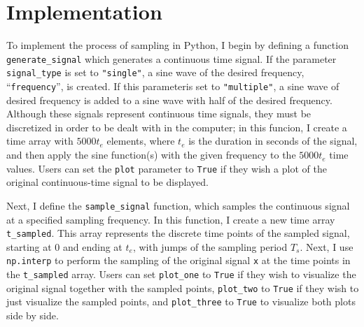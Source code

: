 \documentclass{article}
\begin{document}
\section{Implementation}


To implement the process of sampling in Python, I begin by defining a function \verb|generate_signal| which generates a continuous time signal.
If the parameter \verb|signal_type| is set to \verb|"single"|, a sine wave of the desired frequency, ``\verb|frequency|'', is created.
If this parameteris set to \verb|"multiple"|, a sine wave of desired frequency is added to a sine wave with half of the desired frequency. 
Although these signals represent continuous time signals, they must be discretized in order to be dealt with in the computer;
in this funcion, I create a time array with $5000t_e$ elements, where $t_e$ is the duration in seconds of the signal, 
and then apply the sine function(s) with the given frequency to the $5000 t_e$ time values. 
Users can set the \verb|plot| parameter to \verb|True| if they wish a plot of the original continuous-time signal to be displayed.

Next, I define the \verb|sample_signal| function, which samples the continuous signal at a specified sampling frequency.
In this function, I create a new time array \verb|t_sampled|. 
This array represents the discrete time points of the sampled signal, starting at 0 and ending at $t_e$, with jumps of the sampling period $T_s$.
Next, I use \verb|np.interp| to perform the sampling of the original signal \verb|x| at the time points in the \verb|t_sampled| array.
Users can set \verb|plot_one| to \verb|True| if they wish to visualize the original signal together with the sampled points, \verb|plot_two| to \verb|True| if they wish to just visualize the sampled points, and \verb|plot_three| to \verb|True| to visualize both plots side by side.
\end{document}
